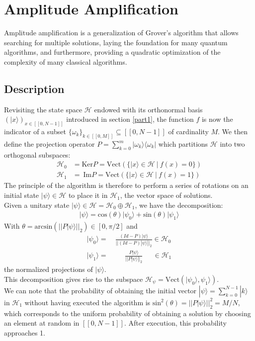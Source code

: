 \section{Amplitude Amplification}
\label{part2}

Amplitude amplification is a generalization of Grover's algorithm that allows searching for multiple solutions, laying the foundation for many quantum algorithms, and furthermore, providing a quadratic optimization of the complexity of many classical algorithms. \cite{brassard2002quantum}

\subsection{Description}
Revisiting the state space $\mathcal{H}$ endowed with its orthonormal basis $(|x \rangle )_{x \in [\![ 0, N-1 ]\!]}$ introduced in section \ref{part1}, the function $f$ is now the indicator of a subset $\{ \omega_k \}_{k \in [\![ 0, M ]\!]} \subseteq [\![ 0, N-1 ]\!]$ of cardinality $M$.
We then define the projection operator $P=\sum_{k = 0}^m |\omega_k \rangle \langle \omega_k |$ which partitions $\mathcal{H}$ into two orthogonal subspaces:
\begin{align*}
	\mathcal{H}_0 &= \mathrm{Ker}P = \mathrm{Vect}(\{ |x\rangle \in \mathcal{H} \ | \ f(x) = 0\}) \\
    \mathcal{H}_1 &= \ \mathrm{Im}P = \mathrm{Vect}(\{ |x\rangle \in \mathcal{H} \ | \ f(x) = 1\})    
\end{align*}
The principle of the algorithm is therefore to perform a series of rotations on an initial state $| \psi \rangle \in \mathcal{H}$ to place it in $\mathcal{H}_1$, the vector space of solutions.
\\
Given a unitary state $| \psi \rangle \in \mathcal{H} = \mathcal{H}_0 \oplus \mathcal{H}_1$, we have the decomposition:
\begin{align*}
    |\psi \rangle = \mathrm{cos}(\theta)| \psi_0 \rangle + \mathrm{sin}(\theta)| \psi_1 \rangle
\end{align*}
With $\theta = \mathrm{arcsin}(||P |\psi \rangle||_2) \in [0, \pi / 2]$ and 
\begin{align*}
|\psi_0 \rangle =&\ \frac{(Id-P) |\psi \rangle}{||(Id-P) |\psi \rangle||_2} \in \mathcal{H}_0 \\ 
|\psi_1 \rangle =&\ \quad \ \, \frac{P |\psi \rangle}{||P |\psi \rangle||_2} \quad \ \ \in \mathcal{H}_1
\end{align*}
the normalized projections of $|\psi \rangle$.
\\
This decomposition gives rise to the subspace $\mathcal{H}_{\psi} = \mathrm{Vect}(|\psi_0 \rangle, \psi_1 \rangle)$. 
\\
We can note that the probability of obtaining the initial vector $|\psi \rangle = \sum_{k=0}^{N-1} |k\rangle$ in $\mathcal{H}_1$ without having executed the algorithm is $\mathrm{sin}^2(\theta) = ||P |\psi \rangle||_2^2 = M/N$, which corresponds to the uniform probability of obtaining a solution by choosing an element at random in $[\![ 0, N-1 ]\!]$. After execution, this probability approaches 1.

